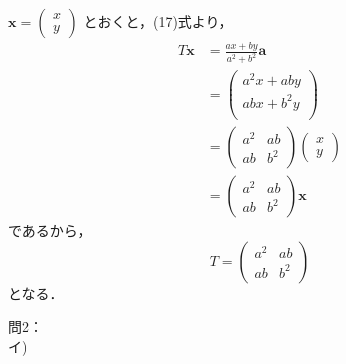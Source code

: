 \documentclass[dvipdfmx,uplatex,11pt]{jsarticle}
\theoremstyle{definition}
\begin{document}
    \newpage
\begin{leftbar}
$\bm{x} =
\left(
\begin{array}{c}
x \\
y
\end{array}
\right)
$
とおくと，(17)式より，
\begin{align*}
T \bm{x} &= \frac{ax+by}{a^2+b^2} \bm{a} \\
&=\left(
\begin{array}{c}
a^2x +aby \\
ab x + b^2y \\
\end{array}
\right)
\\
&=
\begin{pmatrix}
a^2 & ab \\
ab & b^2
\end{pmatrix}
\left(
\begin{array}{c}
x \\
y
\end{array}
\right) \\
&= 
\begin{pmatrix}
a^2 & ab \\
ab & b^2
\end{pmatrix}
\bm{x}
\end{align*}
であるから，
\[
T=\begin{pmatrix}
a^2 & ab \\
ab & b^2
\end{pmatrix}
\]
となる．
\end{leftbar}
%
\newpage
問2：\\
イ)
\end{document}
